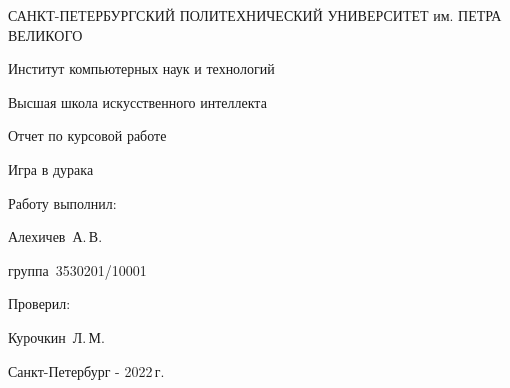 \documentclass[a4paper,12pt]{article}
\begin{document}
    \begin{center}
        \thispagestyle{empty}
        \large САНКТ-ПЕТЕРБУРГСКИЙ ПОЛИТЕХНИЧЕСКИЙ УНИВЕРСИТЕТ им. ПЕТРА ВЕЛИКОГО

        Институт компьютерных наук и технологий

        Высшая школа искусственного интеллекта
        \vspace{9cm}

        Отчет по курсовой работе

        \huge Игра в дурака
    \end{center}
    \vspace{6cm}
    \begin{flushright}
        \large
        Работу выполнил:

        Алехичев~А.\,В.

        группа~3530201/10001
        \vspace{2mm}

        Проверил:

        Курочкин~Л.\,М.
    \end{flushright}
    \begin{center}
        \large Санкт-Петербург - 2022\,г.
    \end{center}

    \newpage

    \tableofcontents

    \newpage
\end{document}
